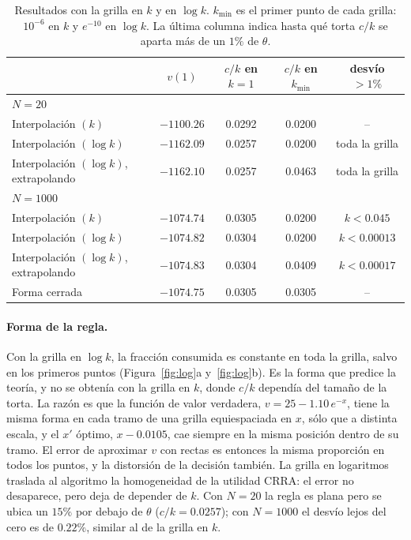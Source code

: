\documentclass[11pt,a4paper]{article}
\begin{document}
\begin{table}[H]
\centering
\begin{tabular}{lcccc}
\toprule
 & $v(1)$ & $c/k$ en $k=1$ & $c/k$ en $k_{\min}$ & desvío $>1\%$\\
\midrule
\multicolumn{5}{l}{\textit{$N=20$}}\\
Interpolación $(k)$                    & $-1100.26$ & 0.0292  & 0.0200 & --\\
Interpolación $(\log k)$               & $-1162.09$ & 0.0257  & 0.0200 & toda la grilla\\ 
Interpolación $(\log k)$, extrapolando & $-1162.10$ & 0.0257  & 0.0463 & toda la grilla\\
\midrule
\multicolumn{5}{l}{\textit{$N=1000$}}\\
Interpolación $(k)$                    & $-1074.74$ & 0.0305  & 0.0200 & $k<0.045$\\
Interpolación $(\log k)$               & $-1074.82$ & 0.0304  & 0.0200 & $k<0.00013$\\
Interpolación $(\log k)$, extrapolando & $-1074.83$ & 0.0304  & 0.0409 & $k<0.00017$\\
\midrule
Forma cerrada                           & $-1074.75$ & 0.0305  & 0.0305 & --\\
\bottomrule
\end{tabular}
\caption{Resultados con la grilla en $k$ y en $\log k$. $k_{\min}$ es el primer punto de cada grilla: $10^{-6}$ en $k$ y $e^{-10}$ en $\log k$. La última columna indica hasta qué torta $c/k$ se aparta más de un $1\%$ de $\theta$.}
\label{tab:log}
\end{table}

\paragraph{Forma de la regla.} Con la grilla en $\log k$, la fracción consumida es constante en toda la grilla, salvo en los primeros puntos (Figura~\ref{fig:log}a y~\ref{fig:log}b). Es la forma que predice la teoría, y no se obtenía con la grilla en $k$, donde $c/k$ dependía del tamaño de la torta. La razón es que la función de valor verdadera, $v=25-1.10\,e^{-x}$, tiene la misma forma en cada tramo de una grilla equiespaciada en $x$, sólo que a distinta escala, y el $x'$ óptimo, $x-0.0105$, cae siempre en la misma posición dentro de su tramo. El error de aproximar $v$ con rectas es entonces la misma proporción en todos los puntos, y la distorsión de la decisión también. La grilla en logaritmos traslada al algoritmo la homogeneidad de la utilidad CRRA: el error no desaparece, pero deja de depender de $k$. Con $N=20$ la regla es plana pero se ubica un $15\%$ por debajo de $\theta$ ($c/k=0.0257$); con $N=1000$ el desvío lejos del cero es de $0.22\%$, similar al de la grilla en $k$.
\end{document}
